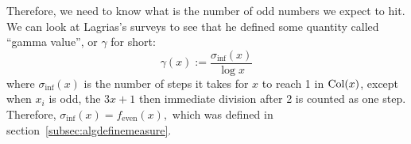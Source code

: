 Therefore, we need to know what is the number of odd numbers we expect to hit. We can look at Lagrias's surveys to see that he defined some quantity called ``gamma value'', or $\gamma$ for short:
\[
\gamma(x) := \frac{\sigma_{\inf}(x)}{\log{x}}
\] 
where $\sigma_{\inf}(x)$ is the number of steps it takes for $x$ to reach 1 in $\mathrm{Col}(x)$, except when $x_i$ is odd, the $3x+1$ then immediate division after 2 is counted as one step. Therefore, $\sigma_{\inf}(x) = f_{\text{even}}(x),$ which was defined in section~\ref{subsec:algdefinemeasure}.


